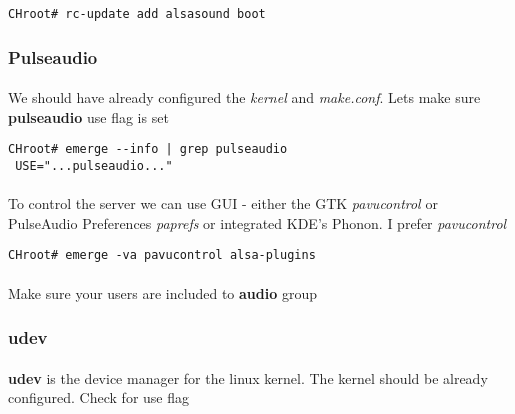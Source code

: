 \documentclass[11pt,a4paper]{article}
\begin{document}
                    \begin{lstlisting}[style=BashInputCHRoot]
 CHroot# rc-update add alsasound boot
                    \end{lstlisting}

                \newpage
                \subsubsection{Pulseaudio}

                    \paragraph{} We should have already configured the \textit{kernel} and \textit{make.conf}. Lets make sure \textbf{pulseaudio} use flag is set

                    \begin{lstlisting}[style=BashInputCHRoot]
 CHroot# emerge --info | grep pulseaudio
 USE="...pulseaudio..."
                    \end{lstlisting}

                    \paragraph{} To control the server we can use GUI - either the GTK \textit{pavucontrol} or PulseAudio Preferences \textit{paprefs} or integrated KDE's Phonon. I prefer \textit{pavucontrol}

                    \begin{lstlisting}[style=BashInputCHRoot]
 CHroot# emerge -va pavucontrol alsa-plugins
                    \end{lstlisting}

                    \paragraph{} Make sure your users are included to \textbf{audio} group

                \newpage
                \subsubsection{udev}

                    \paragraph{} \textbf{udev} is the device manager for the linux kernel. The kernel should be already configured. Check for use flag
\end{document}
